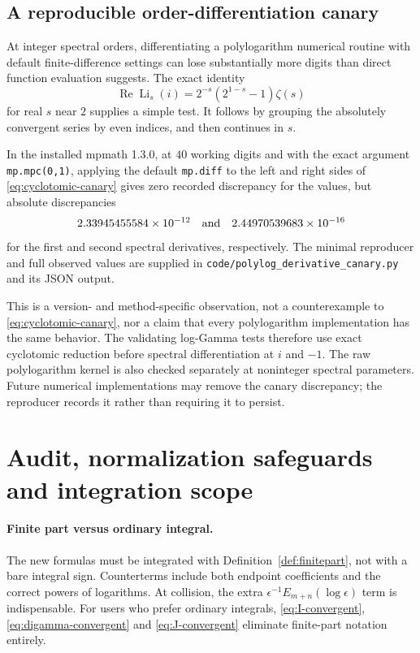 \documentclass[11pt]{article}
\numberwithin{equation}{section}
\theoremstyle{definition}
\theoremstyle{remark}
\DeclareMathOperator{\Li}{Li}
\DeclareMathOperator{\Rea}{Re}
\newcommand{\file}[1]{\nolinkurl{#1}}
\begin{document}
\subsection{A reproducible order-differentiation canary}
\label{sec:canary}
At integer spectral orders, differentiating a polylogarithm numerical
routine with default finite-difference settings can lose substantially
more digits than direct function evaluation suggests. The exact identity
\begin{equation}
 \Rea\Li_s(i)=2^{-s}(2^{1-s}-1)\zeta(s)
 \label{eq:cyclotomic-canary}
\end{equation}
for real $s$ near $2$ supplies a simple test. It follows by grouping
the absolutely convergent series by even indices, and then continues
in $s$.

In the installed mpmath 1.3.0, at $40$ working digits and with the exact
argument \texttt{mp.mpc(0,1)}, applying the default \texttt{mp.diff}
to the left and right sides of \eqref{eq:cyclotomic-canary} gives zero
recorded discrepancy for the values, but absolute discrepancies
\[
 2.33945455584\times10^{-12}\quad\hbox{and}\quad
 2.44970539683\times10^{-16}
\]
for the first and second spectral derivatives, respectively.
The minimal reproducer and full observed values are supplied in
\file{code/polylog_derivative_canary.py} and its JSON output.

This is a version- and method-specific observation, not a counterexample
to \eqref{eq:cyclotomic-canary}, nor a claim that every polylogarithm
implementation has the same behavior. The validating log-Gamma tests
therefore use exact cyclotomic reduction before spectral differentiation
at $i$ and $-1$. The raw polylogarithm kernel is also checked separately
at noninteger spectral parameters. Future numerical implementations may
remove the canary discrepancy; the reproducer records it rather than
requiring it to persist.

\section{Audit, normalization safeguards and integration scope}
\label{sec:audit}

\paragraph{Finite part versus ordinary integral.}
The new formulas must be integrated with Definition~\ref{def:finitepart},
not with a bare integral sign. Counterterms include both endpoint
coefficients and the correct powers of logarithms. At collision, the
extra $\epsilon^{-1}E_{m+n}(\log\epsilon)$ term is indispensable.
For users who prefer ordinary integrals,
\eqref{eq:I-convergent}, \eqref{eq:digamma-convergent} and
\eqref{eq:J-convergent} eliminate finite-part notation entirely.
\end{document}
